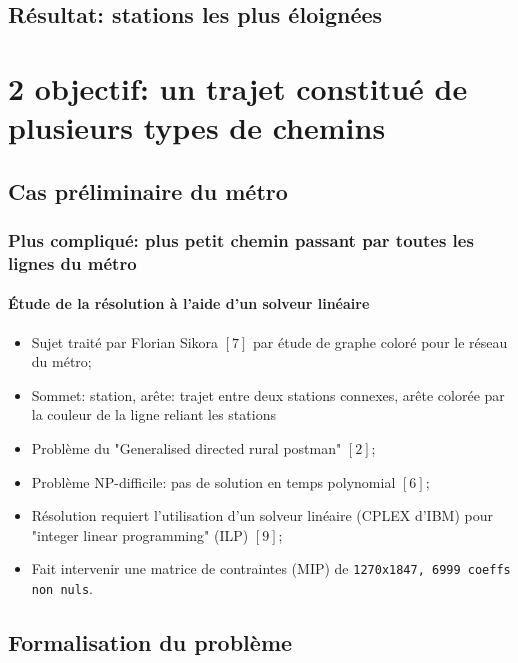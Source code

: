 \documentclass[10pt]{beamer}
\begin{document}
\subsection{Résultat: stations les plus éloignées}

\section{\textbf{2\ieme{} objectif}: un trajet constitué de plusieurs types de chemins}

\subsection{Cas préliminaire du métro}

\begin{frame}
\frametitle{Plus compliqué: plus petit chemin passant par toutes les lignes du métro}
\framesubtitle{Étude de la résolution à l'aide d'un solveur linéaire}
\begin{itemize}
\item Sujet traité par Florian Sikora $[7]$ par étude de graphe coloré pour le réseau du métro;
\item Sommet: station, arête: trajet entre deux stations connexes, arête colorée par la couleur de la ligne reliant les stations
\item Problème du "Generalised directed rural postman" $[2]$;
\item Problème NP-difficile: pas de solution en temps polynomial $[6]$;
\item Résolution requiert l'utilisation d’un solveur linéaire (CPLEX d'IBM) pour "integer linear programming" (ILP) $[9]$;
\item Fait intervenir une matrice de contraintes (MIP) de \texttt{1270x1847, 6999 coeffs non nuls}.
\end{itemize}
\end{frame}

\subsection{Formalisation du problème}
\end{document}
